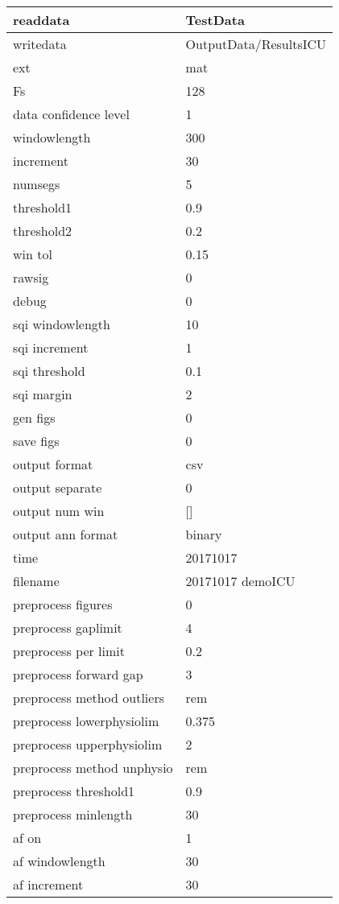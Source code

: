 \begin{tabular}{|l|l|}
\hline
readdata&TestData\\\hline
writedata&OutputData/ResultsICU\\\hline
ext&mat\\\hline
Fs&128\\\hline
data confidence level&1\\\hline
windowlength&300\\\hline
increment&30\\\hline
numsegs&5\\\hline
threshold1&0.9\\\hline
threshold2&0.2\\\hline
win tol&0.15\\\hline
rawsig&0\\\hline
debug&0\\\hline
sqi windowlength&10\\\hline
sqi increment&1\\\hline
sqi threshold&0.1\\\hline
sqi margin&2\\\hline
gen figs&0\\\hline
save figs&0\\\hline
output format&csv\\\hline
output separate&0\\\hline
output num win&[]\\\hline
output ann format&binary\\\hline
time&20171017\\\hline
filename&20171017 demoICU\\\hline
preprocess figures&0\\\hline
preprocess gaplimit&4\\\hline
preprocess per limit&0.2\\\hline
preprocess forward gap&3\\\hline
preprocess method outliers&rem\\\hline
preprocess lowerphysiolim&0.375\\\hline
preprocess upperphysiolim&2\\\hline
preprocess method unphysio&rem\\\hline
preprocess threshold1&0.9\\\hline
preprocess minlength&30\\\hline
af on&1\\\hline
af windowlength&30\\\hline
af increment&30\\\hline

\end{tabular}
